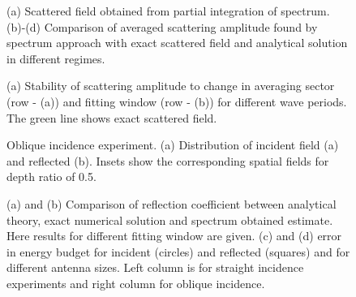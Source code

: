 \begin{figure}
	\centering
	\caption{(a) Scattered field obtained from partial integration of spectrum. (b)-(d) Comparison 
		of averaged scattering amplitude found by spectrum approach with exact scattered field and 
		analytical solution in different regimes.}
\end{figure}

\begin{figure}
	\centering
	\caption{(a) Stability of scattering amplitude to change in averaging sector (row - (a)) and 
		fitting window (row - (b)) for different wave periods. The green line shows exact scattered 
		field.}
\end{figure}

\begin{figure}
	\centering
	\caption{Oblique incidence experiment. (a) Distribution of incident field (a) and reflected 
		(b). Insets show the corresponding spatial fields for depth ratio of 0.5.}
\end{figure}

\begin{figure}
	\centering
	\caption{(a) and (b) Comparison of reflection coefficient between analytical theory, exact 
		numerical solution and spectrum obtained estimate. Here results for different fitting 
		window 
		are given. (c) and (d) error in energy budget for incident (circles) and reflected 
		(squares) 
		and for different antenna sizes. Left column is for straight incidence experiments and 
		right 
		column for oblique incidence.}
\end{figure}






